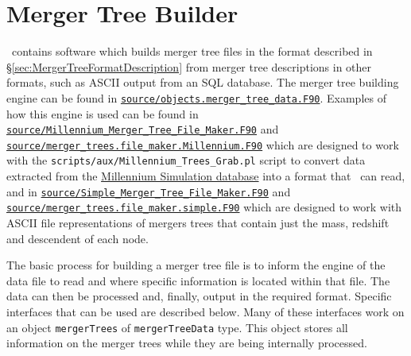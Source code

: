 \section{Merger Tree Builder}\label{sec:MergerTreeBuilder}

\glc\ contains software which builds merger tree files in the format described in \S\ref{sec:MergerTreeFormatDescription} from merger tree descriptions in other formats, such as ASCII output from an SQL database. The merger tree building engine can be found in \hyperlink{objects.merger_tree_data.F90}{{\tt source/objects.merger\_tree\_data.F90}}. Examples of how this engine is used can be found in \hyperlink{Millennium_Merger_Tree_File_Maker.F90}{{\tt source/Millennium\_Merger\_Tree\_File\_Maker.F90}} and \hyperlink{merger_trees.file_maker.Millennium.F90}{{\tt source/merger\_trees.file\_maker.Millennium.F90}} which are designed to work with the {\tt scripts/aux/Millennium\_Trees\_Grab.pl} script to convert data extracted from the \href{http://www.g-vo.org/MyMillennium3/}{Millennium Simulation database} into a format that \glc\ can read, and in \hyperlink{Simple_Merger_Tree_File_Maker.F90}{{\tt source/Simple\_Merger\_Tree\_File\_Maker.F90}} and \hyperlink{merger_trees.file_maker.simple.F90}{{\tt source/merger\_trees.file\_maker.simple.F90}} which are designed to work with ASCII file representations of mergers trees that contain just the mass, redshift and descendent of each node.

The basic process for building a merger tree file is to inform the engine of the data file to read and where specific information is located within that file. The data can then be processed and, finally, output in the required format. Specific interfaces that can be used are described below. Many of these interfaces work on an object {\tt mergerTrees} of {\tt mergerTreeData} type. This object stores all information on the merger trees while they are being internally processed.

